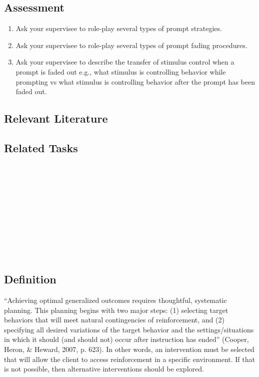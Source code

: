 \subsection{Assessment}
\begin{enumerate}
\item Ask your supervisee to role-play several types of prompt strategies.
\item Ask your supervisee to role-play several types of prompt fading procedures.
\item Ask your supervisee to describe the transfer of stimulus control when a prompt is faded out e.g., what stimulus is controlling behavior while prompting vs what stimulus is controlling behavior after the prompt has been faded out.
\end{enumerate}
%
\subsection{Relevant Literature}
\begin{refsection}
\nocite{etzel1979simplest,
    fisher2014handbook,
    walker2008constant}
\printbibliography[heading=none]
\end{refsection}
%
\subsection{Related Tasks}
\fourdFour{}\\
\fourdFive{}\\
\fourdSix{}\\
\fourdSeven{}\\
\fourdEight{}\\
\foureOne{}\\
\foureTwo{}\\
\foureThirteen{}\\
\fourFKTwentyFour{}\\
%
\clearpage \section[\fourjSix{}]{\fourjSix{}%
              }
\subsection{Definition}
``Achieving optimal generalized outcomes requires thoughtful, systematic planning. This planning begins with two major steps: (1) selecting target behaviors that will meet natural contingencies of reinforcement, and (2) specifying all desired variations of the target behavior and the settings/situations in which it should (and should not) occur after instruction has ended'' (Cooper, Heron, \& Heward, 2007, p. 623). In other words, an intervention must be selected that will allow the client to access reinforcement in a specific environment. If that is not possible, then alternative interventions should be explored. 

